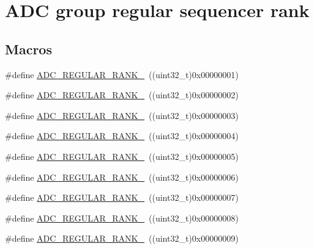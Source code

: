 \hypertarget{group___a_d_c__regular__rank}{}\section{A\+DC group regular sequencer rank}
\label{group___a_d_c__regular__rank}
\subsection*{Macros}
\begin{DoxyCompactItemize}
\item 
\#define \mbox{\hyperlink{group___a_d_c__regular__rank_gadf298d930c7a4f313ece62320dbd600c}{A\+D\+C\+\_\+\+R\+E\+G\+U\+L\+A\+R\+\_\+\+R\+A\+N\+K\+\_}}~((uint32\+\_\+t)0x00000001)
\item 
\#define \mbox{\hyperlink{group___a_d_c__regular__rank_ga21f2593d1950de1b7f98770a21009826}{A\+D\+C\+\_\+\+R\+E\+G\+U\+L\+A\+R\+\_\+\+R\+A\+N\+K\+\_}}~((uint32\+\_\+t)0x00000002)
\item 
\#define \mbox{\hyperlink{group___a_d_c__regular__rank_gadaab09acdc0504f6ed8a84d7de6170dc}{A\+D\+C\+\_\+\+R\+E\+G\+U\+L\+A\+R\+\_\+\+R\+A\+N\+K\+\_}}~((uint32\+\_\+t)0x00000003)
\item 
\#define \mbox{\hyperlink{group___a_d_c__regular__rank_gae23fcbfa4f2a1c919038739cbcb57410}{A\+D\+C\+\_\+\+R\+E\+G\+U\+L\+A\+R\+\_\+\+R\+A\+N\+K\+\_}}~((uint32\+\_\+t)0x00000004)
\item 
\#define \mbox{\hyperlink{group___a_d_c__regular__rank_ga288d36b6b6e483116ca423ee5709580e}{A\+D\+C\+\_\+\+R\+E\+G\+U\+L\+A\+R\+\_\+\+R\+A\+N\+K\+\_}}~((uint32\+\_\+t)0x00000005)
\item 
\#define \mbox{\hyperlink{group___a_d_c__regular__rank_ga6636e3943689f2a196256c939b3aa5f5}{A\+D\+C\+\_\+\+R\+E\+G\+U\+L\+A\+R\+\_\+\+R\+A\+N\+K\+\_}}~((uint32\+\_\+t)0x00000006)
\item 
\#define \mbox{\hyperlink{group___a_d_c__regular__rank_ga63bea206a722dd11460d09b619aa4145}{A\+D\+C\+\_\+\+R\+E\+G\+U\+L\+A\+R\+\_\+\+R\+A\+N\+K\+\_}}~((uint32\+\_\+t)0x00000007)
\item 
\#define \mbox{\hyperlink{group___a_d_c__regular__rank_gab39e2e0fb73beec47d249a75a42b5293}{A\+D\+C\+\_\+\+R\+E\+G\+U\+L\+A\+R\+\_\+\+R\+A\+N\+K\+\_}}~((uint32\+\_\+t)0x00000008)
\item 
\#define \mbox{\hyperlink{group___a_d_c__regular__rank_ga2df1ef58ff97a2a6946b4cc0978e9693}{A\+D\+C\+\_\+\+R\+E\+G\+U\+L\+A\+R\+\_\+\+R\+A\+N\+K\+\_}}~((uint32\+\_\+t)0x00000009)

\end{DoxyCompactItemize}

